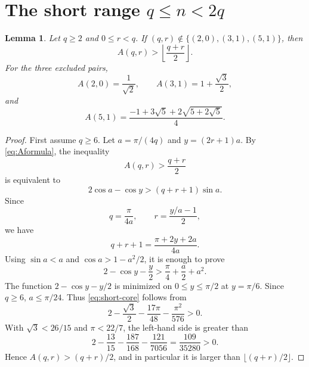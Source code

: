 \documentclass[11pt]{article}
\newtheorem{lemma}{Lemma}
\begin{document}
\section{\texorpdfstring{The short range \(q\le n<2q\)}{The short range q <= n < 2q}}

\begin{lemma}\label{lem:short}
Let \(q\ge2\) and \(0\le r<q\). If \((q,r)\notin\{(2,0),(3,1),(5,1)\}\), then
\[
        A(q,r)>\left\lfloor\frac{q+r}{2}\right\rfloor .
\]
For the three excluded pairs,
\[
        A(2,0)=\frac1{\sqrt2},\qquad
        A(3,1)=1+\frac{\sqrt3}{2},
\]
and
\[
        A(5,1)=
        \frac{-1+3\sqrt5+2\sqrt{5+2\sqrt5}}4.
\]
\end{lemma}

\begin{proof}
First assume \(q\ge6\). Let \(a=\pi/(4q)\) and \(y=(2r+1)a\). By \eqref{eq:Aformula}, the inequality
\[
        A(q,r)>\frac{q+r}{2}
\]
is equivalent to
\[
        2\cos a-\cos y>(q+r+1)\sin a.
\]
Since
\[
        q=\frac{\pi}{4a},
        \qquad
        r=\frac{y/a-1}{2},
\]
we have
\[
        q+r+1=\frac{\pi+2y+2a}{4a}.
\]
Using \(\sin a<a\) and \(\cos a>1-a^2/2\), it is enough to prove
\[
        2-\cos y-\frac y2
        >
        \frac{\pi}{4}+\frac a2+a^2.
        \tag{4}\label{eq:short-core}
\]
The function \(2-\cos y-y/2\) is minimized on \(0\le y\le\pi/2\) at \(y=\pi/6\). Since \(q\ge6\), \(a\le\pi/24\). Thus \eqref{eq:short-core} follows from
\[
        2-\frac{\sqrt3}{2}
        -\frac{17\pi}{48}
        -\frac{\pi^2}{576}>0.
\]
With \(\sqrt3<26/15\) and \(\pi<22/7\), the left-hand side is greater than
\[
        2-\frac{13}{15}-\frac{187}{168}-\frac{121}{7056}
        =
        \frac{109}{35280}>0.
\]
Hence \(A(q,r)>(q+r)/2\), and in particular it is larger than \(\lfloor(q+r)/2\rfloor\).


\end{proof}
\end{document}
